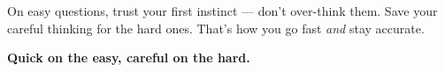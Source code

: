 {\begin{tcolorbox}[
    enhanced,
    colback=funYellowLight,
    colframe=funYellow!60,
    arc=10pt,
    boxrule=1pt,
    left=6mm, right=6mm, top=4mm, bottom=4mm,
]
\vspace{2mm}

On easy questions, trust your first instinct — don't over-think them. Save your careful thinking for the hard ones. That's how you go fast \textit{and} stay accurate.
\end{tcolorbox}

\vspace{4mm}

\begin{center}
{\large\bfseries\color{funOrangeDark} \faBolt\hspace{2mm}Quick on the easy, careful on the hard.\hspace{2mm}\faBolt}
\end{center}

}
\newpage
